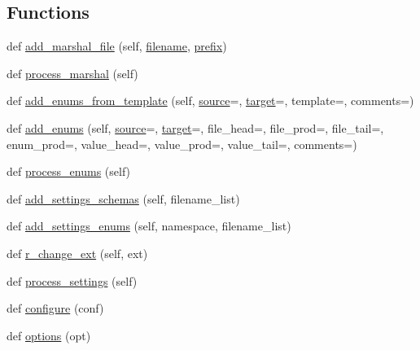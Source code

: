 \subsection*{Functions}
\begin{DoxyCompactItemize}
\item 
def \hyperlink{namespacewaflib_1_1_tools_1_1glib2_acf0a8c8e25827dc3701010d5bfcd7671}{add\+\_\+marshal\+\_\+file} (self, \hyperlink{test__portburn_8cpp_a7efa5e9c7494c7d4586359300221aa5d}{filename}, \hyperlink{structprefix}{prefix})
\item 
def \hyperlink{namespacewaflib_1_1_tools_1_1glib2_a456283be5d64f885ee242262515ab720}{process\+\_\+marshal} (self)
\item 
def \hyperlink{namespacewaflib_1_1_tools_1_1glib2_ab6cc5b3a61941917b2ef0b0ee747d093}{add\+\_\+enums\+\_\+from\+\_\+template} (self, \hyperlink{namespacewaflib_1_1_tools_1_1glib2_aed296e0a65eb90e6dbf195a192acc9a2}{source}=\textquotesingle{}\textquotesingle{}, \hyperlink{lib_2expat_8h_a15a257516a87decb971420e718853137}{target}=\textquotesingle{}\textquotesingle{}, template=\textquotesingle{}\textquotesingle{}, comments=\textquotesingle{}\textquotesingle{})
\item 
def \hyperlink{namespacewaflib_1_1_tools_1_1glib2_a311bc9d55cb4c2ec013725e387841175}{add\+\_\+enums} (self, \hyperlink{namespacewaflib_1_1_tools_1_1glib2_aed296e0a65eb90e6dbf195a192acc9a2}{source}=\textquotesingle{}\textquotesingle{}, \hyperlink{lib_2expat_8h_a15a257516a87decb971420e718853137}{target}=\textquotesingle{}\textquotesingle{}, file\+\_\+head=\textquotesingle{}\textquotesingle{}, file\+\_\+prod=\textquotesingle{}\textquotesingle{}, file\+\_\+tail=\textquotesingle{}\textquotesingle{}, enum\+\_\+prod=\textquotesingle{}\textquotesingle{}, value\+\_\+head=\textquotesingle{}\textquotesingle{}, value\+\_\+prod=\textquotesingle{}\textquotesingle{}, value\+\_\+tail=\textquotesingle{}\textquotesingle{}, comments=\textquotesingle{}\textquotesingle{})
\item 
def \hyperlink{namespacewaflib_1_1_tools_1_1glib2_aca6df9f0a0afde09bfbc5d3e98702075}{process\+\_\+enums} (self)
\item 
def \hyperlink{namespacewaflib_1_1_tools_1_1glib2_ab531686066a4e372e11153f59eb8a628}{add\+\_\+settings\+\_\+schemas} (self, filename\+\_\+list)
\item 
def \hyperlink{namespacewaflib_1_1_tools_1_1glib2_ae4d2a8204307e1016e1da9f22c082bf5}{add\+\_\+settings\+\_\+enums} (self, namespace, filename\+\_\+list)
\item 
def \hyperlink{namespacewaflib_1_1_tools_1_1glib2_a4d5b1ae5edd56cff1b39d4979510bf7b}{r\+\_\+change\+\_\+ext} (self, ext)
\item 
def \hyperlink{namespacewaflib_1_1_tools_1_1glib2_af1dcb72130b8fd03b0227b60d647e0e8}{process\+\_\+settings} (self)
\item 
def \hyperlink{namespacewaflib_1_1_tools_1_1glib2_a0bfcb0b9cc3811f9e8db925651d664fb}{configure} (conf)
\item 
def \hyperlink{namespacewaflib_1_1_tools_1_1glib2_a73e118c0f183f41207cd7b59729a6d9d}{options} (opt)
\end{DoxyCompactItemize}
